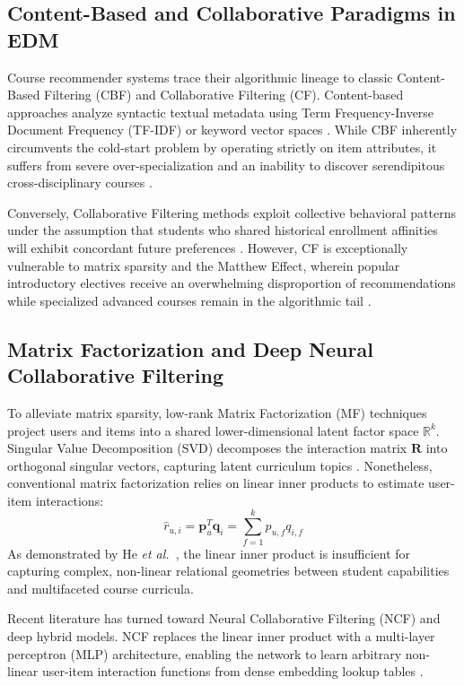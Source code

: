 \documentclass[conference,letterpaper]{IEEEtran}
\newcommand{\etal}{{\em et al.\ }}
\begin{document}
\subsection{Content-Based and Collaborative Paradigms in EDM}
Course recommender systems trace their algorithmic lineage to classic Content-Based Filtering (CBF) and Collaborative Filtering (CF). Content-based approaches analyze syntactic textual metadata using Term Frequency-Inverse Document Frequency (TF-IDF) or keyword vector spaces \cite{pazzani2007}. While CBF inherently circumvents the cold-start problem by operating strictly on item attributes, it suffers from severe over-specialization and an inability to discover serendipitous cross-disciplinary courses \cite{romero2010}.

Conversely, Collaborative Filtering methods exploit collective behavioral patterns under the assumption that students who shared historical enrollment affinities will exhibit concordant future preferences \cite{breese1998}. However, CF is exceptionally vulnerable to matrix sparsity and the Matthew Effect, wherein popular introductory electives receive an overwhelming disproportion of recommendations while specialized advanced courses remain in the algorithmic tail \cite{chen2023bpl, liu2021matthew}.

\subsection{Matrix Factorization and Deep Neural Collaborative Filtering}
To alleviate matrix sparsity, low-rank Matrix Factorization (MF) techniques project users and items into a shared lower-dimensional latent factor space $\mathbb{R}^k$. Singular Value Decomposition (SVD) decomposes the interaction matrix $\mathbf{R}$ into orthogonal singular vectors, capturing latent curriculum topics \cite{koren2009}. Nonetheless, conventional matrix factorization relies on linear inner products to estimate user-item interactions:
\begin{equation}
\hat{r}_{u,i} = \mathbf{p}_u^T \mathbf{q}_i = \sum_{f=1}^k p_{u,f} q_{i,f}
\end{equation}
As demonstrated by He \etal \cite{he2017ncf, he2017nfm}, the linear inner product is insufficient for capturing complex, non-linear relational geometries between student capabilities and multifaceted course curricula.

Recent literature has turned toward Neural Collaborative Filtering (NCF) and deep hybrid models. NCF replaces the linear inner product with a multi-layer perceptron (MLP) architecture, enabling the network to learn arbitrary non-linear user-item interaction functions from dense embedding lookup tables \cite{he2017ncf, zhang2019deep, guo2017deepfm}.
\end{document}
